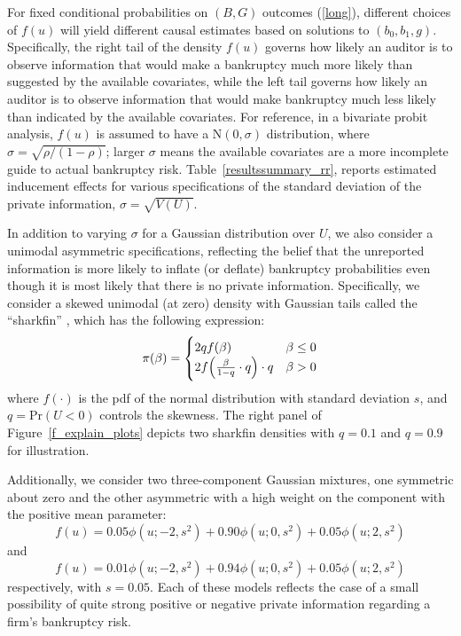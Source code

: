 \documentclass[aoas,preprint, 11pt, dvipsnames, table, x11name]{imsart}
\newcommand{\N}{\mbox{N}}
\theoremstyle{remark}
\begin{document}
	For fixed conditional probabilities on $(B, G)$ outcomes  (\ref{long}), different choices of $f(u)$ will yield different causal estimates based on solutions to $(b_0, b_1, g)$. Specifically, the right tail of the density $f(u)$ governs how likely an auditor is to observe information that would make a bankruptcy much more likely than suggested by the available covariates, while the left tail governs how likely an auditor is to observe information that would make bankruptcy much less likely than indicated by the available covariates. For reference, in a bivariate probit analysis, $f(u)$ is assumed to have a $\N(0, \sigma)$ distribution, where $\sigma = \sqrt{\rho/(1-\rho)}$; larger $\sigma$ means the available covariates are a more incomplete guide to actual bankruptcy risk. Table~\ref{resultssummary_rr}, reports estimated inducement effects for various specifications of the standard deviation of the private information, $\sigma = \sqrt{V(U)}$.
	
	In addition to varying $\sigma$ for a Gaussian distribution over $U$, we also consider a unimodal asymmetric specifications, reflecting the belief that the unreported information is more likely to inflate (or deflate) bankruptcy probabilities even though it is most likely that there is no private information. Specifically, we consider a skewed unimodal (at zero) density with Gaussian tails called the ``sharkfin'' \citep{hahnslice}, which has the following expression:
	\begin{equation}
		\pi(\beta)=\begin{cases}
			2qf(\beta)&\beta\leq 0\\
			2f\qty(\frac{\beta}{1-q}\cdot q)\cdot q&\beta>0
		\end{cases}
		\label{shark}
	\end{equation}
	where $f(\cdot)$ is the pdf of the normal distribution with standard deviation $s$, and $q = \mbox{Pr}(U < 0)$ controls the skewness. The right panel of Figure~\ref{f_explain_plots} depicts two sharkfin densities with $q = 0.1$ and $q = 0.9$ for illustration.
	
	Additionally, we consider two three-component Gaussian mixtures, one symmetric about zero and the other asymmetric with a high weight on the component with the positive mean parameter:
	$$f(u) = 0.05 \phi(u ; -2, s^2) + 0.90 \phi(u ; 0, s^2) + 0.05 \phi(u ; 2, s^2)$$
	and
	$$f(u) = 0.01 \phi(u ; -2, s^2) + 0.94 \phi(u ; 0, s^2) + 0.05 \phi(u ; 2, s^2)$$
	respectively, with $s = 0.05$. Each of these models reflects the case of a small possibility of quite strong positive or negative private information regarding a firm's bankruptcy risk.
	
\end{document}
